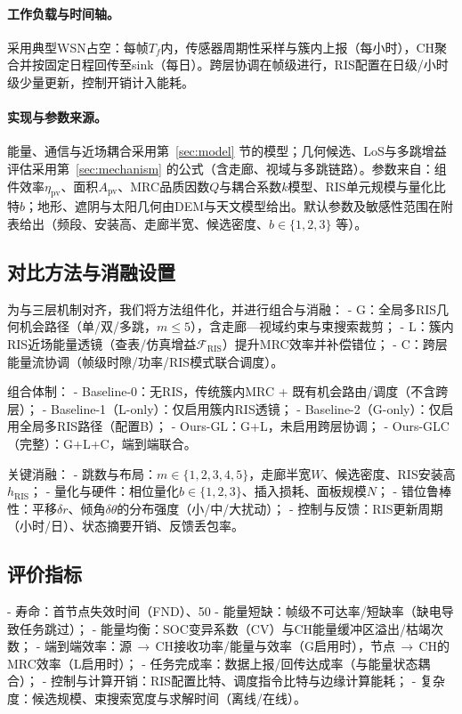 \paragraph{工作负载与时间轴。} 采用典型WSN占空：每帧$T_f$内，传感器周期性采样与簇内上报（每小时），CH聚合并按固定日程回传至sink（每日）。跨层协调在帧级进行，RIS配置在日级/小时级少量更新，控制开销计入能耗。

\paragraph{实现与参数来源。} 能量、通信与近场耦合采用第~\ref{sec:model} 节的模型；几何候选、LoS与多跳增益评估采用第~\ref{sec:mechanism} 的公式（含走廊、视域与多跳链路）。参数来自：组件效率$\eta_{\text{pv}}$、面积$A_{\text{pv}}$、MRC品质因数$Q$与耦合系数$k$模型、RIS单元规模与量化比特$b$；地形、遮阴与太阳几何由DEM与天文模型给出。默认参数及敏感性范围在附表给出（频段、安装高、走廊半宽、候选密度、$b\in\{1,2,3\}$ 等）。

\subsection{对比方法与消融设置}
为与三层机制对齐，我们将方法组件化，并进行组合与消融：
- G：全局多RIS几何机会路径（单/双/多跳，$m\le5$），含走廊—视域约束与束搜索裁剪；
- L：簇内RIS近场能量透镜（查表/仿真增益$\mathcal{F}_{\text{RIS}}$）提升MRC效率并补偿错位；
- C：跨层能量流协调（帧级时隙/功率/RIS模式联合调度）。

\noindent 组合体制：
- Baseline-0：无RIS，传统簇内MRC + 既有机会路由/调度（不含跨层）；
- Baseline-1（L-only）：仅启用簇内RIS透镜；
- Baseline-2（G-only）：仅启用全局多RIS路径（配置B）；
- Ours-GL：G+L，未启用跨层协调；
- Ours-GLC（完整）：G+L+C，端到端联合。

\noindent 关键消融：
- 跳数与布局：$m\in\{1,2,3,4,5\}$，走廊半宽$W$、候选密度、RIS安装高$h_{\text{RIS}}$；
- 量化与硬件：相位量化$b\in\{1,2,3\}$、插入损耗、面板规模$N$；
- 错位鲁棒性：平移$\delta r$、倾角$\delta\theta$的分布强度（小/中/大扰动）；
- 控制与反馈：RIS更新周期（小时/日）、状态摘要开销、反馈丢包率。

\subsection{评价指标}
- 寿命：首节点失效时间（FND）、50%
- 能量短缺：帧级不可达率/短缺率（缺电导致任务跳过）；
- 能量均衡：SOC变异系数（CV）与CH能量缓冲区溢出/枯竭次数；
- 端到端效率：源\,$\to$\,CH接收功率/能量与效率（G启用时），节点\,$\to$\,CH的MRC效率（L启用时）；
- 任务完成率：数据上报/回传达成率（与能量状态耦合）；
- 控制与计算开销：RIS配置比特、调度指令比特与边缘计算能耗；
- 复杂度：候选规模、束搜索宽度与求解时间（离线/在线）。

